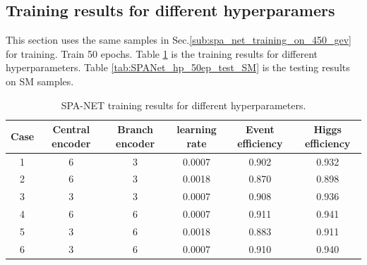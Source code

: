 \documentclass[12pt]{article}
\begin{document}
	\subsection{Training results for different hyperparamers}%
	\label{sub:training_results_for_different_hyperparamers}
		This section uses the same samples in Sec.\ref{sub:spa_net_training_on_450_gev} for training. Train 50 epochs. Table \ref{tab:SPANet_hp_50ep} is the training results for different hyperparameters. Table \ref{tab:SPANet_hp_50ep_test_SM} is the testing results on SM samples.
		
		\begin{table}[htpb]
			\centering
			\caption{SPA-NET training results for different hyperparameters.}
			\label{tab:SPANet_hp_50ep}
			\begin{tabular}{c|ccc|cc}
			 Case & Central encoder & Branch encoder & learning rate & Event efficiency & Higgs efficiency \\
			 \hline
			 1&    6             &     3           &  0.0007             &   0.902               &    0.932              \\
			 2&    6             &     3           &  0.0018             &   0.870               &    0.898              \\
			 3&    3             &     3           &  0.0007             &   0.908               &    0.936             \\
			 4&    6             &     6           &  0.0007             &   0.911               &    0.941             \\
			 5&    3             &     6           &  0.0018             &   0.883               &    0.911             \\
			 6&    3             &     6           &  0.0007             &   0.910               &    0.940             
			\end{tabular}
		\end{table}
\end{document}
